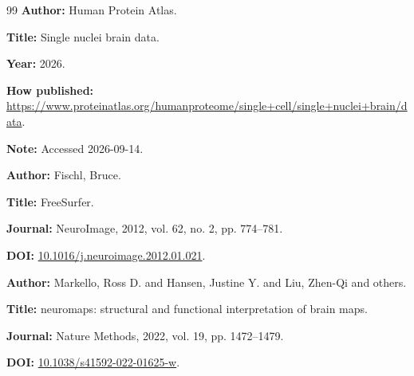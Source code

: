 \documentclass[10pt,twocolumn]{article}
\begin{document}
\begin{thebibliography}{99}
\textbf{Author:} Human Protein Atlas.

\textbf{Title:} Single nuclei brain data.

\textbf{Year:} 2026.

\textbf{How published:} \url{https://www.proteinatlas.org/humanproteome/single+cell/single+nuclei+brain/data}.

\textbf{Note:} Accessed 2026-09-14.

\textbf{Author:} Fischl, Bruce.

\textbf{Title:} FreeSurfer.

\textbf{Journal:} NeuroImage, 2012, vol. 62, no. 2, pp. 774--781.

\textbf{DOI:} \href{https://doi.org/10.1016/j.neuroimage.2012.01.021}{10.1016/j.neuroimage.2012.01.021}.

\textbf{Author:} Markello, Ross D. and Hansen, Justine Y. and Liu, Zhen-Qi and others.

\textbf{Title:} neuromaps: structural and functional interpretation of brain maps.

\textbf{Journal:} Nature Methods, 2022, vol. 19, pp. 1472--1479.

\textbf{DOI:} \href{https://doi.org/10.1038/s41592-022-01625-w}{10.1038/s41592-022-01625-w}.

\end{thebibliography}



\balance
\end{document}
